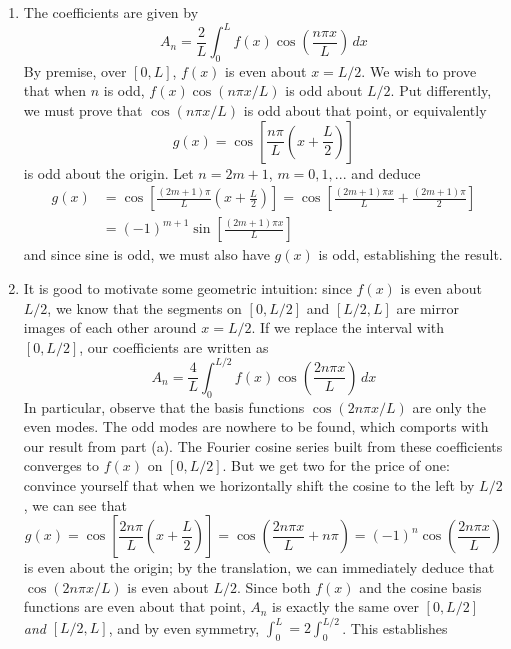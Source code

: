 \documentclass[a4paper]{article}
\begin{document}
\begin{enumerate}[label=(\alph*)]
	\item The coefficients are given by
	\[
		A_{n} = \frac{2}{L}\int^{L}_{0} f \!\left( x \right)\cos\!\left(\frac{n \pi x}{L}\right) \, dx 
	\]
	By premise, over \( \!\left[ 0,L \right] \), \( f \!\left( x \right) \) is even about \( x = L/2 \). We wish to prove that when \( n \) is odd, \( f \!\left( x \right)\cos\!\left(n \pi x / L\right) \) is odd about \( L/2 \). Put differently, we must prove that \( \cos\!\left(n \pi x / L\right) \) is odd about that point, or equivalently
	\[
		g \!\left( x \right) = \cos\!\left[\frac{n \pi}{L}\!\left( x + \frac{L}{2} \right)\right] 
	\]
	is odd about the origin. Let \( n = 2m + 1 \), \( m = 0,1,... \) and deduce
	\begin{align*}
		g \!\left( x \right) & = \cos\!\left[\frac{\!\left( 2m + 1 \right)\pi}{L}\!\left( x + \frac{L}{2} \right)\right] = \cos\!\left[\frac{\!\left( 2m + 1 \right)\pi x}{L} + \frac{\!\left( 2m + 1 \right)\pi}{2}\right] \\
				     & = \!\left( -1 \right)^{m + 1}\sin\!\left[\frac{\!\left( 2m + 1 \right)\pi x}{L}\right]
	\end{align*}
	and since sine is odd, we must also have \( g \!\left( x \right) \) is odd, establishing the result.
	\item It is good to motivate some geometric intuition: since \( f \!\left( x \right) \) is even about \( L/2 \), we know that the segments on \( \!\left[ 0,L/2 \right] \) and \( \!\left[ L/2,L \right] \) are mirror images of each other around \( x = L/2 \). If we replace the interval with \( \!\left[ 0,L/2 \right] \), our coefficients are written as 
	\[
		A_{n} = \frac{4}{L}\int^{L/2}_{0} f \!\left( x \right)\cos\!\left(\frac{2n \pi x}{L}\right) \, dx  
	\]
	In particular, observe that the basis functions \( \cos\!\left(2n \pi x / L\right) \) are only the even modes. The odd modes are nowhere to be found, which comports with our result from part (a). The Fourier cosine series built from these coefficients converges to \( f \!\left( x \right) \) on \( \!\left[ 0,L/2 \right] \). But we get two for the price of one: convince yourself that when we horizontally shift the cosine to the left by \( L/2 \), we can see that
	\[
		g \!\left( x \right) = \cos\!\left[\frac{2n \pi}{L}\!\left( x + \frac{L}{2} \right)\right] = \cos\!\left(\frac{2n \pi x}{L} + n \pi\right) = \!\left( -1 \right)^{n}\cos\!\left(\frac{2n \pi x}{L}\right)
	\]
	is even about the origin; by the translation, we can immediately deduce that \( \cos\!\left(2n \pi x / L\right) \) is even about \( L/2 \). Since both \( f \!\left( x \right) \) and the cosine basis functions are even about that point, \( A_{n} \) is exactly the same over \( \!\left[ 0,L/2 \right] \) \textit{and} \( \!\left[ L/2,L \right] \), and by even symmetry, \( \int^{L}_{0} = 2\int^{L/2}_{0}  \). This establishes

\end{enumerate}
\end{document}
